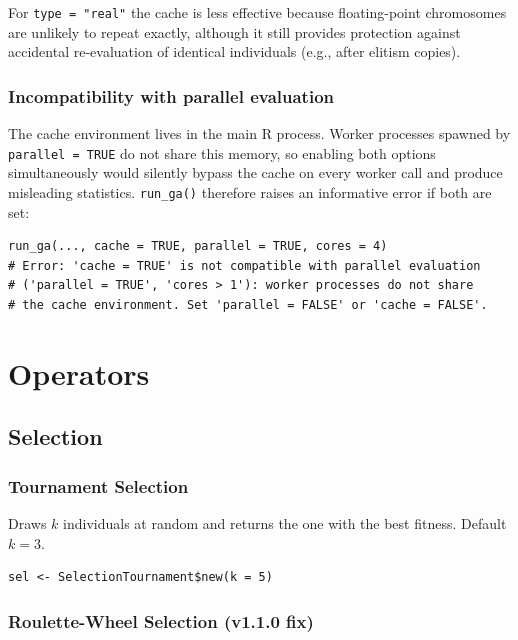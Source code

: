 \documentclass[11pt,a4paper]{article}
\begin{document}
For \texttt{type = "real"} the cache is less effective because floating-point
chromosomes are unlikely to repeat exactly, although it still provides
protection against accidental re-evaluation of identical individuals (e.g.,
after elitism copies).

\subsubsection*{Incompatibility with parallel evaluation}

The cache environment lives in the main R process. Worker processes spawned by
\texttt{parallel = TRUE} do not share this memory, so enabling both options
simultaneously would silently bypass the cache on every worker call and produce
misleading statistics. \texttt{run\_ga()} therefore raises an informative error
if both are set:

\begin{lstlisting}
run_ga(..., cache = TRUE, parallel = TRUE, cores = 4)
# Error: 'cache = TRUE' is not compatible with parallel evaluation
# ('parallel = TRUE', 'cores > 1'): worker processes do not share
# the cache environment. Set 'parallel = FALSE' or 'cache = FALSE'.
\end{lstlisting}

\section{Operators}

\subsection{Selection}

\subsubsection{Tournament Selection}

Draws $k$ individuals at random and returns the one with the best fitness.
Default $k = 3$.

\begin{lstlisting}
sel <- SelectionTournament$new(k = 5)
\end{lstlisting}

\subsubsection{Roulette-Wheel Selection (v1.1.0 fix)}
\end{document}
